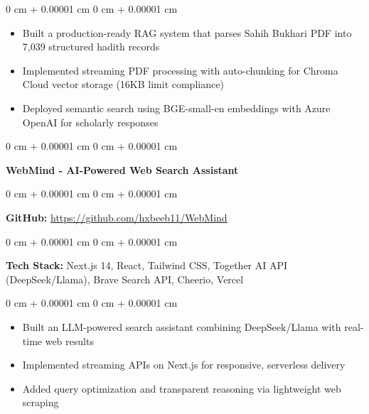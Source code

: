 \documentclass[10pt, letterpaper]{article}
\newenvironment{highlights}{
    \begin{itemize}[
        topsep=0.10 cm,
        parsep=0.10 cm,
        partopsep=0pt,
        itemsep=0pt,
        leftmargin=0 cm + 10pt
    ]
}{
    \end{itemize}
} %
\newenvironment{onecolentry}{
    \begin{adjustwidth}{
        0 cm + 0.00001 cm
    }{
        0 cm + 0.00001 cm
    }
}{
    \end{adjustwidth}
} %
\let\hrefOriginal\href
\renewcommand{\href}[2]{\hrefOriginal{#1}{\uline{#2}}}
\begin{document}
    \vspace{0.10 cm}

    \begin{onecolentry}
        \begin{highlights}
            \item Built a production-ready RAG system that parses Sahih Bukhari PDF into 7,039 structured hadith records
            \item Implemented streaming PDF processing with auto-chunking for Chroma Cloud vector storage (16KB limit compliance)
            \item Deployed semantic search using BGE-small-en embeddings with Azure OpenAI for scholarly responses
        \end{highlights}
    \end{onecolentry}

    \vspace{0.2 cm}
    
    \begin{onecolentry}
        \textbf{WebMind - AI-Powered Web Search Assistant}  
    \end{onecolentry}

        \vspace{0.10 cm}

    \begin{onecolentry}
        \textbf{GitHub:} \href{https://github.com/hxbeeb11/WebMind}
        {https://github.com/hxbeeb11/WebMind}  
    \end{onecolentry}

    \vspace{0.10 cm}

    \begin{onecolentry}
        \textbf{Tech Stack:} Next.js 14, React, Tailwind CSS, Together AI API (DeepSeek/Llama), Brave Search API, Cheerio, Vercel  
    \end{onecolentry}

    \vspace{0.10 cm}

    \begin{onecolentry}
        \begin{highlights}
            \item Built an LLM-powered search assistant combining DeepSeek/Llama with real-time web results
            \item Implemented streaming APIs on Next.js for responsive, serverless delivery
            \item Added query optimization and transparent reasoning via lightweight web scraping
        \end{highlights}
    \end{onecolentry}
\end{document}
